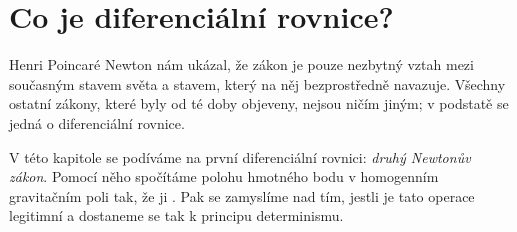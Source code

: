 \chapter{Co je diferenciální rovnice?}\label{ch:Co je diferencialni rovnice}
\begin{chapquote}{Henri Poincaré}%
Newton nám ukázal, že zákon je pouze nezbytný vztah mezi současným stavem světa a stavem, který na něj bezprostředně navazuje. Všechny ostatní zákony, které byly od té doby objeveny, nejsou ničím jiným; v podstatě se jedná o diferenciální rovnice.
\end{chapquote}

V této kapitole se podíváme na první diferenciální rovnici: \textit{druhý Newtonův zákon}. Pomocí něho spočítáme polohu hmotného bodu v homogenním gravitačním poli tak, že ji . Pak se zamyslíme nad tím, jestli je tato operace  legitimní a dostaneme se tak k principu determinismu.

